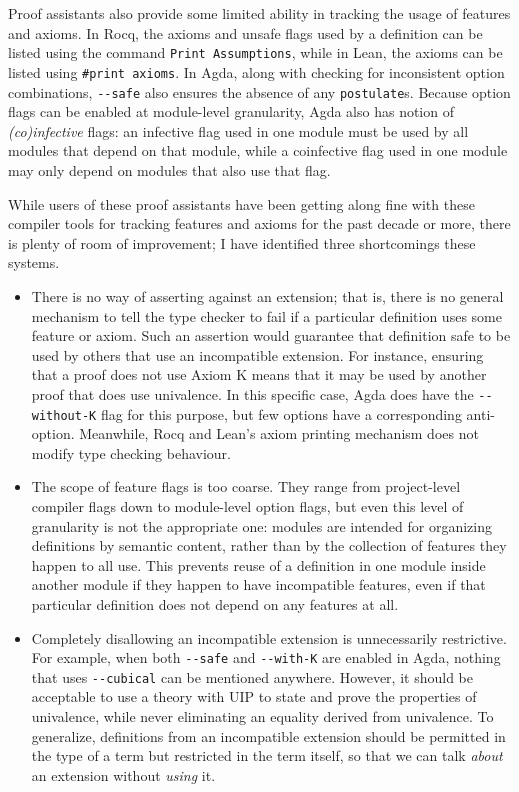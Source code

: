 \documentclass{article}
\newcommand{\code}[1]{\texttt{#1}}
\begin{document}
Proof assistants also provide some limited ability in tracking the usage of features and axioms.
In Rocq, the axioms and unsafe flags used by a definition
can be listed using the command \code{Print Assumptions},
while in Lean, the axioms can be listed using \code{\#print axioms}.
In Agda, along with checking for inconsistent option combinations,
\code{-{}-safe} also ensures the absence of any \code{postulate}s.
Because option flags can be enabled at module-level granularity,
Agda also has notion of \emph{(co)infective} flags:
an infective flag used in one module
must be used by all modules that depend on that module,
while a coinfective flag used in one module
may only depend on modules that also use that flag.

While users of these proof assistants have been getting along fine
with these compiler tools for tracking features and axioms for the past decade or more,
there is plenty of room of improvement;
I have identified three shortcomings these systems.
%
\begin{itemize}
  \item There is no way of asserting against an extension;
    that is, there is no general mechanism to tell the type checker to fail
    if a particular definition uses some feature or axiom.
    Such an assertion would guarantee that definition safe to be used by others
    that use an incompatible extension.
    For instance, ensuring that a proof does not use Axiom K
    means that it may be used by another proof that does use univalence.
    In this specific case, Agda does have the \code{-{}-without-K} flag for this purpose,
    but few options have a corresponding anti-option.
    Meanwhile, Rocq and Lean's axiom printing mechanism
    does not modify type checking behaviour.
  \item The scope of feature flags is too coarse.
    They range from project-level compiler flags
    down to module-level option flags,
    but even this level of granularity is not the appropriate one:
    modules are intended for organizing definitions by semantic content,
    rather than by the collection of features they happen to all use.
    This prevents reuse of a definition in one module inside another module
    if they happen to have incompatible features,
    even if that particular definition does not depend on any features at all.
  \item Completely disallowing an incompatible extension is unnecessarily restrictive.
    For example, when both \code{-{}-safe} and \code{-{}-with-K} are enabled in Agda,
    nothing that uses \code{-{}-cubical} can be mentioned anywhere.
    However, it should be acceptable to use a theory with UIP
    to state and prove the properties of univalence,
    while never eliminating an equality derived from univalence.
    To generalize, definitions from an incompatible extension
    should be permitted in the type of a term but restricted in the term itself,
    so that we can talk \emph{about} an extension without \emph{using} it.
\end{itemize}
\end{document}
